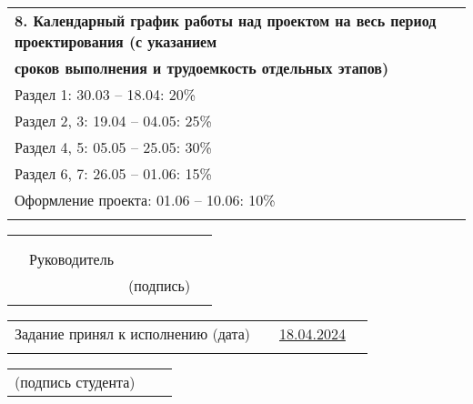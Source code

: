 \documentclass[12pt, А4, twoside]{article} %
\begin{document}
\begin{flushleft}
		\begin{tabular}{p{17.25cm}} 
			\vspace{1pt} \\ \hline  
			\textsf{\textbf{8. Календарный график работы над проектом на весь период проектирования (с указанием }} \vspace{1pt} \\ \hline 
			\textsf{\textbf{сроков выполнения и трудоемкость отдельных этапов)}} \vspace{1pt} \\ \hline
			\textsf{Раздел 1: 30.03 – 18.04: 20\%} \vspace{1pt} \\ \hline
			\textsf{Раздел 2, 3: 19.04 – 04.05: 25\%} \vspace{1pt} \\ \hline
			\textsf{Раздел 4, 5: 05.05 – 25.05: 30\%} \vspace{1pt} \\ \hline
			\textsf{Раздел 6, 7: 26.05 – 01.06: 15\%} \vspace{1pt} \\ \hline
			\textsf{Оформление проекта:   01.06  – 10.06:    10\%} \vspace{1pt} \\ \hline
			 \vspace{1pt} \\ \hline
		\end{tabular} 
		
		\begin{tabular}{p{4.2cm} p{3.8cm} p{6.0cm} p{2.0cm}} 
			& & & 
			\\ 
			& & & 
			\\
			& \fontsize{14}{17.5} \textrm{Руководитель} & \uline{\hspace{5.8cm}}
			\vspace{1pt}  & 
			\\ 
			& & \centering \fontsize{12}{15} \textsf{(подпись)} & 
			\\ 
			& & &
		\end{tabular} 
		
		\fontsize{12}{15}
		
		\begin{tabular}{p{7.5cm} p{0.5cm} p{6.0cm} p{2.0cm}} %
			\textsf{Задание принял к исполнению (дата)} & &
			\centering \uline{\hspace{2.1cm}\textsf{18.04.2024}\hspace{2.0cm}} \vspace{1pt}  & 
			\\ %
			& & & %
		\end{tabular} %
		
		\begin{tabular}{p{4.0cm} p{0.2cm} p{9.8cm} p{2.0cm}} %
			\textsf{(подпись студента)} & \multicolumn{2}{l}{\uline{\hspace{10.3cm}}}
			\vspace{1pt}  &  
			\\ %
		\end{tabular} %
		
	\end{flushleft} %
	
\end{document}

